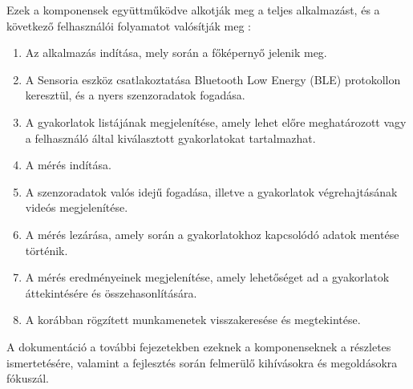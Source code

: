 Ezek a komponensek együttműködve alkotják meg a teljes alkalmazást, és a következő felhasználói
folyamatot valósítják meg :
\begin{enumerate}
    \item Az alkalmazás indítása, mely során a főképernyő jelenik meg.
    \item A Sensoria eszköz csatlakoztatása Bluetooth Low Energy (BLE) protokollon keresztül,
    és a nyers szenzoradatok fogadása.
    \item A gyakorlatok listájának megjelenítése, amely lehet előre meghatározott vagy a
    felhasználó által kiválasztott gyakorlatokat tartalmazhat.
    \item A mérés indítása.
    \item A szenzoradatok valós idejű fogadása, illetve a gyakorlatok végrehajtásának videós megjelenítése.
    \item A mérés lezárása, amely során a gyakorlatokhoz kapcsolódó adatok mentése történik.
    \item A mérés eredményeinek megjelenítése, amely lehetőséget ad a gyakorlatok áttekintésére és összehasonlítására.
    \item A korábban rögzített munkamenetek visszakeresése és megtekintése.
\end{enumerate}

A dokumentáció a további fejezetekben ezeknek a komponenseknek a részletes ismertetésére,
valamint a fejlesztés során felmerülő kihívásokra és megoldásokra fókuszál.